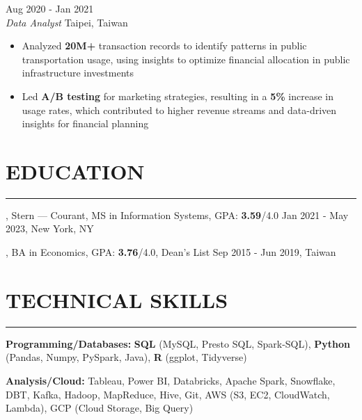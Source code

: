 \documentclass[11pt,letterpaper]{article}
\begin{document}
\vspace{0.3\baselineskip}  %
 \hfill Aug 2020 - Jan 2021\\[-1pt]
\textit{Data Analyst} \hfill Taipei, Taiwan
\begin{itemize}[leftmargin=1.5em, rightmargin=0pt, itemsep=-1pt, topsep=0pt, parsep=0pt]
  \item \justifying Analyzed \textbf{20M+} transaction records to identify patterns in public transportation usage, using insights to optimize financial allocation in public infrastructure investments
  \item \justifying Led \textbf{A/B testing} for marketing strategies, resulting in a \textbf{5\%} increase in usage rates, which contributed to higher revenue streams and data-driven insights for financial planning
\end{itemize}

\vspace{0.35\baselineskip}  %
\section*{EDUCATION}
\vspace{-8pt}\noindent\rule{\textwidth}{0.8pt}

\vspace{2pt}
, Stern — Courant, MS in Information Systems, GPA: \textbf{3.59}/4.0 \hfill Jan 2021 - May 2023, New York, NY

\vspace{2pt}  %
, BA in Economics, GPA: \textbf{3.76}/4.0, Dean's List \hfill Sep 2015 - Jun 2019, Taiwan

\vspace{0.3\baselineskip}  %
\section*{TECHNICAL SKILLS}
\vspace{-8pt}\noindent\rule{\textwidth}{0.8pt}

\vspace{2pt}
\noindent\textbf{Programming/Databases:} \textbf{SQL} (MySQL, Presto SQL, Spark-SQL), \textbf{Python} (Pandas, Numpy, PySpark, Java), \textbf{R} (ggplot, Tidyverse)

\vspace{2pt}  %
\noindent\textbf{Analysis/Cloud:} {Tableau}, {Power BI}, {Databricks}, {Apache Spark}, {Snowflake}, {DBT}, {Kafka}, {Hadoop}, {MapReduce}, {Hive}, {Git}, {AWS} (S3, EC2, CloudWatch, Lambda), {GCP} (Cloud Storage, Big Query)
\end{document}
